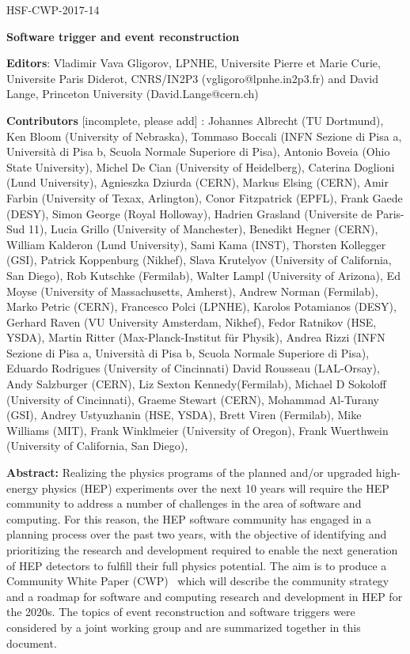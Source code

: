 \begin{flushright}
HSF-CWP-2017-14
\end{flushright}

\Large
\begin{center}
{\bf Software trigger and event reconstruction}
\end{center}
\vskip 1cm

\normalsize

\hangindent=1cm
{\bf Editors}: Vladimir Vava Gligorov, LPNHE, Universite Pierre et Marie Curie, Universite Paris Diderot, CNRS/IN2P3 (vgligoro@lpnhe.in2p3.fr) and David Lange, Princeton University (David.Lange@cern.ch) 

\vskip 0.2cm
\hangindent=1cm
{\bf Contributors} [incomplete, please add] : 
Johannes Albrecht (TU Dortmund), 
Ken Bloom (University of Nebraska), 
Tommaso Boccali (INFN Sezione di Pisa a, Università di Pisa b, Scuola Normale Superiore di Pisa), 
Antonio Boveia (Ohio State University), 
Michel De Cian (University of Heidelberg), 
Caterina Doglioni (Lund University), 
Agnieszka Dziurda (CERN), 
Markus Elsing (CERN), 
Amir Farbin (University of Texax, Arlington), 
Conor Fitzpatrick (EPFL), 
Frank Gaede (DESY), 
Simon George (Royal Holloway), 
Hadrien Grasland (Universite de Paris-Sud 11), 
Lucia Grillo (University of Manchester), 
Benedikt Hegner (CERN), 
William Kalderon (Lund University), 
Sami Kama (INST), 
Thorsten Kollegger (GSI), 
Patrick Koppenburg (Nikhef), 
Slava Krutelyov (University of California, San Diego), 
Rob Kutschke (Fermilab), 
Walter Lampl (University of Arizona), 
Ed Moyse (University of Massachusetts, Amherst), 
Andrew Norman (Fermilab), 
Marko Petric (CERN), 
Francesco Polci (LPNHE), 
Karolos Potamianos (DESY), 
Gerhard Raven (VU University Amsterdam, Nikhef), 
Fedor Ratnikov (HSE, YSDA), 
Martin Ritter (Max-Planck-Institut für Physik),  
Andrea Rizzi (INFN Sezione di Pisa a, Università di Pisa b, Scuola Normale Superiore di Pisa), 
Eduardo Rodrigues (University of Cincinnati)
David Rousseau (LAL-Orsay), 
Andy Salzburger (CERN), 
Liz Sexton Kennedy(Fermilab), 
Michael D Sokoloff (University of Cincinnati), 
Graeme Stewart (CERN), 
Mohammad Al-Turany (GSI),  
Andrey Ustyuzhanin (HSE, YSDA), 
Brett Viren (Fermilab), 
Mike Williams (MIT), 
Frank Winklmeier (University of Oregon), 
Frank Wuerthwein (University of California, San Diego), 

\vskip 1cm


\hangindent=1cm
{\bf Abstract:} Realizing the physics programs of the planned and/or upgraded high-energy physics (HEP) experiments over the next 10 years will require the HEP community to address a number of challenges in the area of software and computing. For this reason, the HEP software community has engaged in a planning process over the past two years, with the objective of identifying and prioritizing the research and development required to enable the next generation of HEP detectors to fulfill their full physics potential. The aim is to produce a Community White Paper (CWP)~\cite{HSF2017} which will describe the community strategy and a roadmap for software and computing research and development in HEP for the 2020s. The topics of event reconstruction and software triggers were considered by a joint working group and are summarized together in this document.

